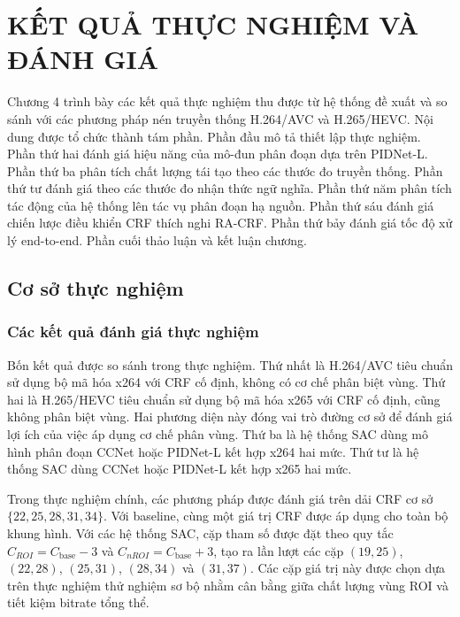 \chapter{KẾT QUẢ THỰC NGHIỆM VÀ ĐÁNH GIÁ}
\label{chap:ket-qua}

Chương 4 trình bày các kết quả thực nghiệm thu được từ hệ thống đề xuất và so sánh với các phương pháp nén truyền thống H.264/AVC và H.265/HEVC. Nội dung được tổ chức thành tám phần. Phần đầu mô tả thiết lập thực nghiệm. Phần thứ hai đánh giá hiệu năng của mô-đun phân đoạn dựa trên PIDNet-L. Phần thứ ba phân tích chất lượng tái tạo theo các thước đo truyền thống. Phần thứ tư đánh giá theo các thước đo nhận thức ngữ nghĩa. Phần thứ năm phân tích tác động của hệ thống lên tác vụ phân đoạn hạ nguồn. Phần thứ sáu đánh giá chiến lược điều khiển CRF thích nghi RA-CRF. Phần thứ bảy đánh giá tốc độ xử lý end-to-end. Phần cuối thảo luận và kết luận chương.

\section{Cơ sở thực nghiệm}
\label{sec:thiet-lap}

\subsection{Các kết quả đánh giá thực nghiệm}
\label{subsec:baseline}

Bốn kết quả
 được so sánh trong thực nghiệm. Thứ nhất là H.264/AVC tiêu chuẩn sử dụng bộ mã hóa x264 với CRF cố định, không có cơ chế phân biệt vùng. Thứ hai là H.265/HEVC tiêu chuẩn sử dụng bộ mã hóa x265 với CRF cố định, cũng không phân biệt vùng. Hai phương diện này đóng vai trò đường cơ sở để đánh giá lợi ích của việc áp dụng cơ chế phân vùng. Thứ ba là hệ thống SAC dùng mô hình phân đoạn CCNet hoặc PIDNet-L kết hợp x264 hai mức. Thứ tư là hệ thống SAC dùng CCNet hoặc PIDNet-L kết hợp x265 hai mức.

Trong thực nghiệm chính, các phương pháp được đánh giá trên dải CRF cơ sở $\{22,25,28,31,34\}$. Với baseline, cùng một giá trị CRF được áp dụng cho toàn bộ khung hình. Với các hệ thống SAC, cặp tham số được đặt theo quy tắc $C_{ROI}=C_{\text{base}}-3$ và $C_{nROI}=C_{\text{base}}+3$, tạo ra lần lượt các cặp $(19,25)$, $(22,28)$, $(25,31)$, $(28,34)$ và $(31,37)$. Các cặp giá trị này được chọn dựa trên thực nghiệm thử nghiệm sơ bộ nhằm cân bằng giữa chất lượng vùng ROI và tiết kiệm bitrate tổng thể.

